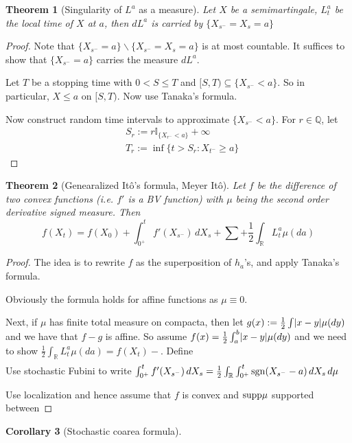 \documentclass[openany,oneside]{book}
\newtheorem{thm}{Theorem}[section]
\newtheorem{cor}[thm]{Corollary}
\theoremstyle{definition}
\theoremstyle{remark}
\newcommand{\I}{\mathbb{I}} %
\DeclarePairedDelimiter{\abs}{\lvert}{\rvert} %
\begin{document}
\begin{thm}[Singularity of $L^a$ as a measure]
Let $X$ be a semimartingale, $L^a_t$ be the local time of $X$ at $a$, then $d L^a$ is carried by $\{X_{s^-} = X_s =a\}$
\end{thm}
\begin{proof}
Note that $\{X_{s^-}=a\} \backslash \{X_{s^-}=X_s=a\}$ is at most countable. It suffices to show that $\{X_{s^-}=a\}$ carries the measure $d L^a$.

Let $T$ be a stopping time with $0< S\le T$ and $[S,T) \subseteq \{X_{s^-} < a\}$. So in particular, $X\le a$ on $[S,T)$. Now use Tanaka's formula.

Now construct random time intervals to approximate $\{X_{s^-}< a\}$. For $r\in \mathbb{Q}$, let
\begin{align*}
& S_r := r\I_{\{X_{r^-}<a\}} + \infty \\
& T_r := \inf\{t>S_r : X_{t^-}\ge a\}
\end{align*}
\end{proof}


\begin{thm}[Genearalized It\^o's formula, Meyer It\^o]
Let $f$ be the difference of two convex functions (i.e. $f'$ is a BV function) with $\mu$ being the second order derivative signed measure. Then
$$f(X_t) = f(X_0) + \int_{0^+}^t f'(X_{s^-}) \,d X_s  + \sum + \frac{1}{2}\int_{\mathbb{R}} L^a_t \mu(d a)$$
\end{thm}
\begin{proof}
The idea is to rewrite $f$ as the superposition of $h_a$'s, and apply Tanaka's formula.

Obviously the formula holds for affine functions as $\mu\equiv 0$.

Next, if $\mu$ has finite total measure on compacta, then let $g(x):= \frac{1}{2} \int \abs{x-y} \mu(dy)$ and we have that $f-g$ is affine. So assume $f(x) = \frac{1}{2} \int_a^b \abs{x-y} \mu(dy)$ and we need to show $\frac{1}{2}\int_{\mathbb{R}} L^a_t \mu(da) = f(X_t) - $. Define
\begin{align*}
\end{align*}
Use stochastic Fubini to write $\int_{0^+}^t f'(X_{s^-}) \,d X_s = \frac{1}{2} \int_{\mathbb{R}} \int_{0^+}^t {\rm sgn}(X_{s^-}-a) \,d X_s \,d\mu$

Use localization and hence assume that $f$ is convex and ${\rm supp }\mu$ supported between
\end{proof}


\begin{cor}[Stochastic coarea formula]

\end{cor}
\end{document}
